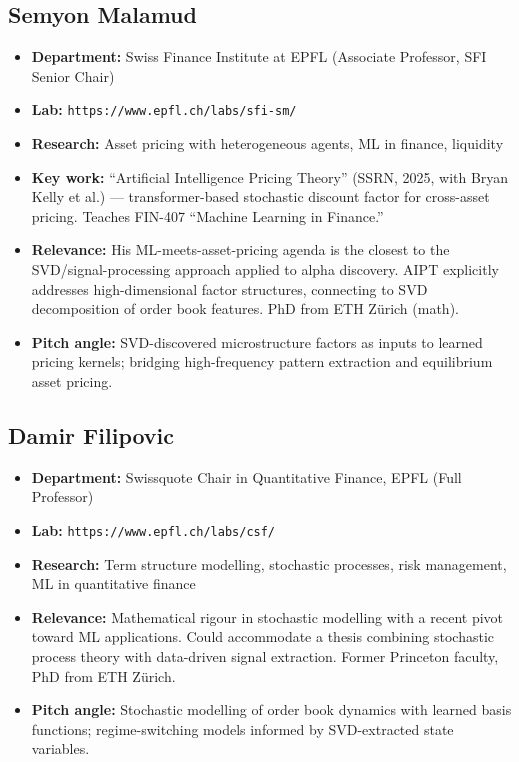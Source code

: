 \documentclass[11pt,a4paper]{article}
\newcommand{\url}[1]{\texttt{#1}}
\begin{document}
\subsection{Semyon Malamud}
\begin{itemize}
  \item \textbf{Department:} Swiss Finance Institute at EPFL (Associate Professor, SFI Senior Chair)
  \item \textbf{Lab:} \url{https://www.epfl.ch/labs/sfi-sm/}
  \item \textbf{Research:} Asset pricing with heterogeneous agents, ML in finance, liquidity
  \item \textbf{Key work:} ``Artificial Intelligence Pricing Theory'' (SSRN, 2025, with Bryan Kelly et al.) --- transformer-based stochastic discount factor for cross-asset pricing. Teaches FIN-407 ``Machine Learning in Finance.''
  \item \textbf{Relevance:} His ML-meets-asset-pricing agenda is the closest to the SVD/signal-processing approach applied to alpha discovery. AIPT explicitly addresses high-dimensional factor structures, connecting to SVD decomposition of order book features. PhD from ETH Z\"urich (math).
  \item \textbf{Pitch angle:} SVD-discovered microstructure factors as inputs to learned pricing kernels; bridging high-frequency pattern extraction and equilibrium asset pricing.
\end{itemize}

\subsection{Damir Filipovic}
\begin{itemize}
  \item \textbf{Department:} Swissquote Chair in Quantitative Finance, EPFL (Full Professor)
  \item \textbf{Lab:} \url{https://www.epfl.ch/labs/csf/}
  \item \textbf{Research:} Term structure modelling, stochastic processes, risk management, ML in quantitative finance
  \item \textbf{Relevance:} Mathematical rigour in stochastic modelling with a recent pivot toward ML applications. Could accommodate a thesis combining stochastic process theory with data-driven signal extraction. Former Princeton faculty, PhD from ETH Z\"urich.
  \item \textbf{Pitch angle:} Stochastic modelling of order book dynamics with learned basis functions; regime-switching models informed by SVD-extracted state variables.
\end{itemize}
\end{document}
